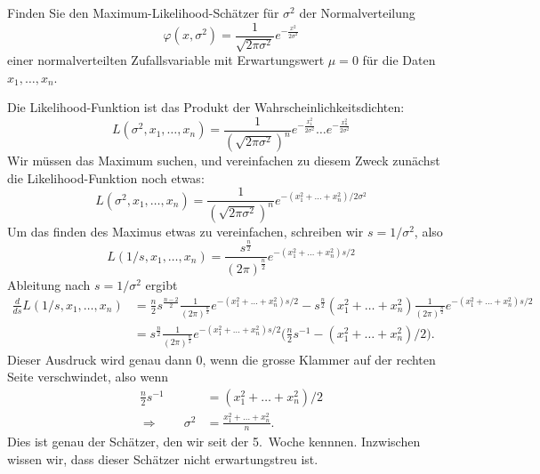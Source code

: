 Finden Sie den Maximum-Likelihood-Schätzer für $\sigma^2$ der Normalverteilung
\[
\varphi(x,\sigma^2)
= 
\frac1{\sqrt{2\pi \sigma^2}} e^{-\frac{x^2}{2\sigma^2}}
\]
einer normalverteilten Zufallsvariable mit Erwartungswert $\mu=0$ für die
Daten $x_1,\dots,x_n$.

\begin{loesung}
Die Likelihood-Funktion ist das Produkt der Wahrscheinlichkeitsdichten:
\[
L(\sigma^2,x_1,\dots,x_n)
=
\frac1{(\sqrt{2\pi \sigma^2})^n}
e^{-\frac{x_1^2}{2\sigma^2}}
\dots
e^{-\frac{x_n^2}{2\sigma^2}}
\]
Wir müssen das Maximum suchen, und vereinfachen zu diesem Zweck zunächst
die Likelihood-Funktion noch etwas:
\[
L(\sigma^2,x_1,\dots,x_n)
=
\frac1{(\sqrt{2\pi \sigma^2})^n}
e^{-(x_1^2+\dots+x_n^2)/2\sigma^2}
\]
Um das finden des Maximus etwas zu vereinfachen, schreiben wir $s=1/\sigma^2$,
also
\[
L(1/s,x_1,\dots,x_n)
=
\frac{s^{\frac{n}2}}{(2\pi)^{\frac{n}2}}
e^{-(x_1^2+\dots+x_n^2)s/2}
\]
Ableitung nach $s=1/\sigma^2$ ergibt
\begin{align*}
\frac{d}{ds}
L(1/s,x_1,\dots,x_n)
&=
\frac{n}2s^{\frac{n-2}2}
\frac1{(2\pi)^{\frac{n}2}}
e^{-(x_1^2+\dots+x_n^2)s/2}
-
s^{\frac{n}2}
(x_1^2+\dots+x_n^2)
\frac1{(2\pi)^{\frac{n}2}}
e^{-(x_1^2+\dots+x_n^2)s/2}
\\
&=
s^{\frac{n}2}
\frac1{(2\pi)^{\frac{n}2}}
e^{-(x_1^2+\dots+x_n^2)s/2}
\biggl(
\frac{n}2
s^{-1}
-
(x_1^2+\dots+x_n^2)/2
\biggr).
\end{align*}
Dieser Ausdruck wird genau dann $0$, wenn die grosse Klammer auf der
rechten Seite verschwindet, also wenn
\begin{align*}
\frac{n}2
s^{-1}
&=
(x_1^2+\dots+x_n^2)/2
\\
\Rightarrow\qquad
\sigma^2
&=
\frac{x_1^2+\dots+x_n^2}n.
\end{align*}
Dies ist genau der Schätzer, den wir seit der 5.~Woche kennnen.
Inzwischen wissen wir, dass dieser Schätzer nicht erwartungstreu ist.
\end{loesung}



